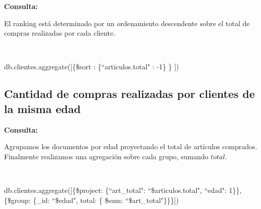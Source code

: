 \textbf{Consulta: }

El ranking está determinado por un ordenamiento descendente sobre el total de compras
realizadas por cada cliente.

~

db.clientes.aggregate([\{\$sort : \{``articulos.total" : -1\} \} ])

\subsection{Cantidad de compras realizadas por clientes de la misma edad}

\textbf{Consulta: }

Agrupamos los documentos por edad proyectando el total de artículos comprados.
Finalmente realizamos una agregación sobre cada grupo, sumando $total$.

~

db.clientes.aggregate([\{\$project: \{``art_total": ``\$articulos.total", ``edad": 1\}\}, \{\$group: \{_id: ``\$edad", total: \{ \$sum: ``\$art_total"\}\}\}])














